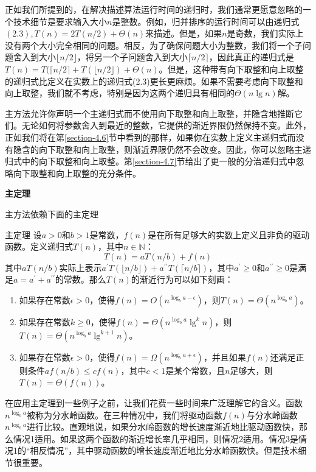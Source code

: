 \documentclass[lang=cn,newtx,10pt,scheme=chinese]{elegantbook}
\begin{document}
正如我们所提到的，在解决描述算法运行时间的递归时，我们通常更愿意忽略的一个技术细节是要求输入大小$n$是整数。例如，归并排序的运行时间可以由递归式$(2.3), T(n)=2 T(n / 2)+\Theta(n)$来描述。但是，如果$n$是奇数，我们实际上没有两个大小完全相同的问题。相反，为了确保问题大小为整数，我们将一个子问题舍入到大小$\lfloor n / 2\rfloor$，将另一个子问题舍入到大小$\lceil n / 2\rceil$，因此真正的递归式是$T(n)=T(\lceil n / 2\rceil+T(\lfloor n / 2\rfloor)+\Theta(n)$。但是，这种带有向下取整和向上取整的递归式比定义在实数上的递归式(2.3)更长更麻烦。如果不需要考虑向下取整和向上取整，我们就不考虑，特别是因为这两个递归具有相同的$\Theta(n \lg n)$解。

主方法允许你声明一个主递归式而不使用向下取整和向上取整，并隐含地推断它们。无论如何将参数舍入到最近的整数，它提供的渐近界限仍然保持不变。此外，正如我们将在第\ref{section-4.6}节中看到的那样，如果你在实数上定义主递归式而没有隐含的向下取整和向上取整，则渐近界限仍然不会改变。因此，你可以忽略主递归式中的向下取整和向上取整。第\ref{section-4.7}节给出了更一般的分治递归式中忽略向下取整和向上取整的充分条件。

\textbf{主定理}

主方法依赖下面的主定理

\begin{theorem}{主定理}{}
设$a>0$和$b>1$是常数，$f(n)$是在所有足够大的实数上定义且非负的驱动函数。定义递归式$T(n)$，其中$n \in \mathbb{N}$：
$$
T(n)=a T(n / b)+f(n)
$$
其中$a T(n / b)$实际上表示$a^{\prime} T(\lfloor n / b\rfloor)+a^{\prime \prime} T(\lceil n / b\rceil)$，其中$a^{\prime} \geq 0$和$a^{\prime \prime} \geq 0$是满足$a=a^{\prime}+a^{\prime \prime}$的常数。那么$T(n)$的渐近行为可以如下刻画：
\begin{enumerate}
\item 如果存在常数$\epsilon>0$，使得$f(n)=O(n^{\log _b a-\epsilon})$，则$T(n)=\Theta(n^{\log _b a})$。
\item 如果存在常数$k \geq 0$，使得$f(n)=\Theta(n^{\log _b a} \lg ^k n)$，则$T(n)=\Theta(n^{\log _b a} \lg ^{k+1} n)$。
\item 如果存在常数$\epsilon>0$，使得$f(n)=\Omega(n^{\log _b a+\epsilon})$，并且如果$f(n)$还满足正则条件$a f(n / b) \leq c f(n)$，其中$c<1$是某个常数，且$n$足够大，则$T(n)=\Theta(f(n))$。
\end{enumerate}
\end{theorem}

在应用主定理到一些例子之前，让我们花费一些时间来广泛理解它的含义。函数$n^{\log _b a}$被称为分水岭函数。在三种情况中，我们将驱动函数$f(n)$与分水岭函数$n^{\log _b a}$进行比较。直观地说，如果分水岭函数的增长速度渐近地比驱动函数快，那么情况1适用。如果这两个函数的渐近增长率几乎相同，则情况2适用。情况3是情况1的“相反情况”，其中驱动函数的增长速度渐近地比分水岭函数快。但是技术细节很重要。
\end{document}
